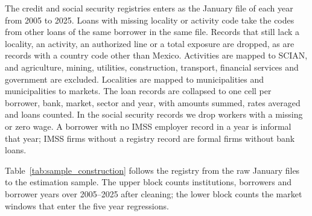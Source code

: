 \documentclass[12pt]{article}
\begin{document}
The credit and social security registries enters as the January file of each year from 2005 to 2025. Loans with missing locality or activity code take the codes from other loans of the same borrower in the same file. Records that still lack a locality, an activity, an authorized line or a total exposure are dropped, as are records with a country code other than Mexico. Activities are mapped to SCIAN, and agriculture, mining, utilities, construction, transport, financial services and government are excluded. Localities are mapped to municipalities and municipalities to markets. The loan records are collapsed to one cell per borrower, bank, market, sector and year, with amounts summed, rates averaged and loans counted. In the social security records
we drop workers with a missing or zero wage. A borrower with no IMSS employer record in a year is informal that year; IMSS firms without a registry record are formal firms without bank loans. 

Table~\ref{tab:sample_construction} follows the registry from the raw January files to the estimation sample. The upper block counts institutions, borrowers and borrower years over 2005--2025 after cleaning; the lower block counts the market windows that enter the five year regressions. 

\begin{table}[H] 
    \caption{From the raw credit registry to the estimation sample}
    \label{tab:sample_construction}
    \centering
    
\end{table}


%     
\end{document}
